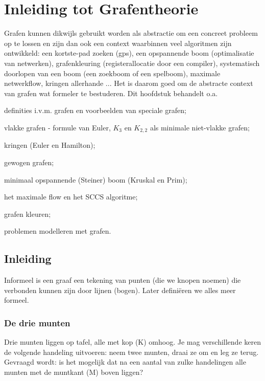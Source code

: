\chapter{Inleiding tot Grafentheorie}

Grafen kunnen dikwijls gebruikt worden als abstractie om een concreet
probleem op te lossen en zijn dan ook een context waarbinnen veel
algoritmen zijn ontwikkeld: een kortste-pad zoeken (gps), een
opspannende boom (optimalisatie van netwerken), grafenkleuring
(registerallocatie door een compiler), systematisch doorlopen van een
boom (een zoekboom of een spelboom), maximale netwerkflow, kringen
allerhande ... Het is daarom goed om de abstracte context van grafen
wat formeler te bestuderen. Dit hoofdstuk behandelt o.a.
\begin{inparaenum}[~~]
\item 
definities i.v.m. grafen en voorbeelden van speciale grafen;
\item 
vlakke grafen - formule van Euler, $K_3$ en $K_{2,2}$ als minimale niet-vlakke
grafen;
\item
kringen (Euler en Hamilton);
\item 
gewogen grafen;
\item
minimaal opspannende (Steiner) boom (Kruskal en Prim);
\item
het maximale flow en het SCCS algoritme;
\item
grafen kleuren;
\item
problemen modelleren met grafen.
\end{inparaenum}




\section{Inleiding}

Informeel is een graaf een tekening van punten (die we knopen noemen)
die verbonden kunnen zijn door lijnen (bogen). Later defini\"eren we
alles meer formeel.

\subsection{De drie munten}

Drie munten liggen op tafel, alle met kop (K) omhoog. Je mag
verschillende keren de volgende handeling uitvoeren: neem twee munten,
draai ze om en leg ze terug. Gevraagd wordt: is het mogelijk dat na
een aantal van zulke handelingen alle munten met de muntkant (M) boven
liggen?

